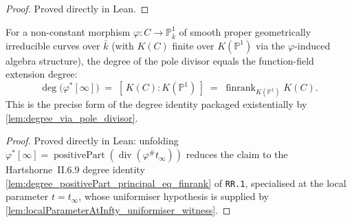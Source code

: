 \begin{proof}

\leanok
  Proved directly in Lean.
\end{proof}
\begin{theorem}
  \label{thm:poleDivisor_degree_eq_finrank}
  For a non-constant morphism \(\varphi \colon C \to \mathbb P^1_{\bar k}\) of
  smooth proper geometrically irreducible curves over \(\bar k\) (with \(K(C)\)
  finite over \(K(\mathbb P^1)\) via the \(\varphi\)-induced algebra structure),
  the degree of the pole divisor equals the function-field extension degree:
  \[
    \deg\!\bigl(\varphi^*[\infty]\bigr)
    \;=\;
    [\,K(C) : K(\mathbb P^1)\,]
    \;=\;
    \operatorname{finrank}_{K(\mathbb P^1)} K(C).
  \]
  This is the precise form of the degree identity packaged existentially by
  \cref{lem:degree_via_pole_divisor}.
\end{theorem}
\begin{proof}
        \leanok
  Proved directly in Lean: unfolding \(\varphi^*[\infty] =
  \operatorname{positivePart}(\operatorname{div}(\varphi^\# t_\infty))\)
  reduces the claim to the Hartshorne~II.6.9 degree identity
  \cref{lem:degree_positivePart_principal_eq_finrank} of \texttt{RR.1},
  specialised at the local parameter \(t = t_\infty\), whose uniformiser
  hypothesis is supplied by \cref{lem:localParameterAtInfty_uniformiser_witness}.
\end{proof}
